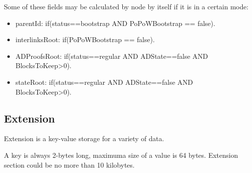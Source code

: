 \vspace{1em}
Some of these fields may be calculated by node by itself if it is in a certain mode:

\begin{itemize}
    \item parentId: if(status==bootstrap AND PoPoWBootstrap == false).
    \item interlinksRoot: if(PoPoWBootstrap == false).
    \item ADProofsRoot: if(status==regular AND ADState==false AND BlocksToKeep>0).
    \item stateRoot: if(status==regular AND ADState==false AND BlocksToKeep>0).
\end{itemize}

\subsection{Extension}

Extension is a key-value storage for a variety of data.

A key is always 2-bytes long, maximuma size of a value is 64 bytes. Extension section could be no more than 10 kilobytes.



